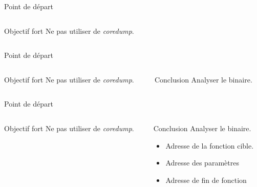 \documentclass[A4,svgnames,9pt,aspectratio=169]{beamer}
\begin{document}
\begin{frame}{Point de départ}

  \begin{columns}
    \begin{column}{0.5\textwidth}
      \begin{block}{Objectif fort}
        Ne pas utiliser de \textit{coredump}.
    \end{block}
  \end{column}

  \begin{column}{0.5\textwidth}
  \end{column}
  
  
  \end{columns}
\end{frame}
\begin{frame}[noframenumbering]{Point de départ}

  \begin{columns}
    \begin{column}{0.5\textwidth}
      \begin{block}{Objectif fort}
        Ne pas utiliser de \textit{coredump}.
    \end{block}
  \end{column}

  \begin{column}{0.5\textwidth}
    \begin{block}{Conclusion}
      Analyser le binaire.
    \end{block}
  \end{column}
  
  
  \end{columns}
\end{frame}
\begin{frame}[noframenumbering]{Point de départ}

  \begin{columns}
    \begin{column}{0.5\textwidth}
      \begin{block}{Objectif fort}
        Ne pas utiliser de \textit{coredump}.
    \end{block}
  \end{column}

  \begin{column}{0.5\textwidth}
    \begin{block}{Conclusion}
      Analyser le binaire.
      \begin{itemize}
        \item Adresse de la fonction cible.
        \item Adresse des paramètres
        \item Adresse de fin de fonction
      \end{itemize}
    \end{block}
  \end{column}
  
  
  \end{columns}
\end{frame}
\end{document}
